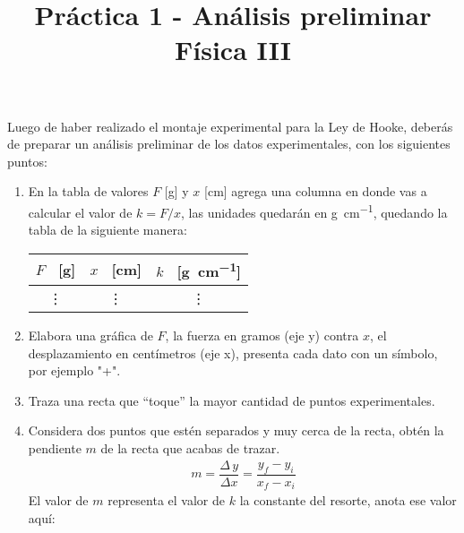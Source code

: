\documentclass[14pt]{extarticle}
\title{\vspace*{-2cm} Práctica 1 - Análisis preliminar \\  Física III\vspace{-5ex}}
\date{}
\begin{document}
\maketitle

Luego de haber realizado el montaje experimental para la Ley de Hooke, deberás de preparar un análisis preliminar de los datos experimentales, con los siguientes puntos:

\begin{enumerate}
\item En la tabla de valores $F$ [\unit{\gram}] y $x$ [\unit{\centi\meter}] agrega una columna en donde vas a calcular el valor de $k = F/x$, las unidades quedarán en \unit{\gram\per\centi\meter}, quedando la tabla de la siguiente manera:
\begin{table}[H]
\centering
\begin{tabular}{c | c | c}
$F$ \, [\unit{\gram}] & $x$ \, [\unit{\centi\meter}] & $k$ \, [\unit{\gram\per\centi\meter}] \\ \hline
\vdots & \vdots & \vdots \\
\end{tabular}
\end{table}
\item Elabora una gráfica de $F$, la fuerza en gramos (eje y) contra $x$, el desplazamiento en centímetros (eje x), presenta cada dato con un símbolo, por ejemplo "+".
\item Traza una recta que \enquote{toque} la mayor cantidad de puntos experimentales.
\item Considera dos puntos que estén separados y muy cerca de la recta, obtén la pendiente $m$ de la recta que acabas de trazar.
\begin{align*}
m = \dfrac{\Delta \, y}{\Delta x} = \dfrac{y_{f} - y_{i}}{x_{f} - x_{i}}
\end{align*}
El valor de $m$ representa el valor de $k$ la constante del resorte, anota ese valor aquí:


\end{enumerate}
\end{document}
